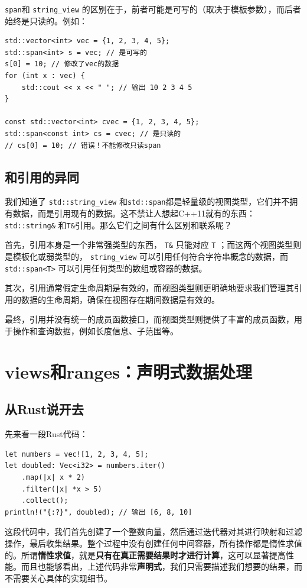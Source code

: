 \verb|span|和 \verb|string_view| 的区别在于，前者可能是可写的（取决于模板参数），而后者始终是只读的。例如：
\begin{verbatim}
std::vector<int> vec = {1, 2, 3, 4, 5};
std::span<int> s = vec; // 是可写的
s[0] = 10; // 修改了vec的数据
for (int x : vec) {
    std::cout << x << " "; // 输出 10 2 3 4 5
}

const std::vector<int> cvec = {1, 2, 3, 4, 5};
std::span<const int> cs = cvec; // 是只读的
// cs[0] = 10; // 错误！不能修改只读span
\end{verbatim}

\subsection{和引用的异同}

我们知道了 \verb|std::string_view| 和\verb|std::span|都是轻量级的视图类型，它们并不拥有数据，而是引用现有的数据。这不禁让人想起C++11就有的东西： \verb|std::string&| 和\verb|T&|引用。那么它们之间有什么区别和联系呢？

首先，引用本身是一个非常强类型的东西， \verb|T&| 只能对应 \verb|T| ；而这两个视图类型则是模板化或弱类型的， \verb|string_view| 可以引用任何符合字符串概念的数据，而 \verb|std::span<T>| 可以引用任何类型的数组或容器的数据。

其次，引用通常假定生命周期是有效的，而视图类型则更明确地要求我们管理其引用的数据的生命周期，确保在视图存在期间数据是有效的。

最终，引用并没有统一的成员函数接口，而视图类型则提供了丰富的成员函数，用于操作和查询数据，例如长度信息、子范围等。

\section{views和ranges：声明式数据处理}

\subsection{从Rust说开去}

先来看一段Rust代码：
\begin{verbatim}
let numbers = vec![1, 2, 3, 4, 5];
let doubled: Vec<i32> = numbers.iter()
    .map(|x| x * 2)
    .filter(|x| *x > 5)
    .collect();
println!("{:?}", doubled); // 输出 [6, 8, 10]
\end{verbatim}

这段代码中，我们首先创建了一个整数向量，然后通过迭代器对其进行映射和过滤操作，最后收集结果。整个过程中没有创建任何中间容器，所有操作都是惰性求值的。所谓\textbf{惰性求值}，就是\textbf{只有在真正需要结果时才进行计算}，这可以显著提高性能。而且也能够看出，上述代码非常\textbf{声明式}，我们只需要描述我们想要的结果，而不需要关心具体的实现细节。

